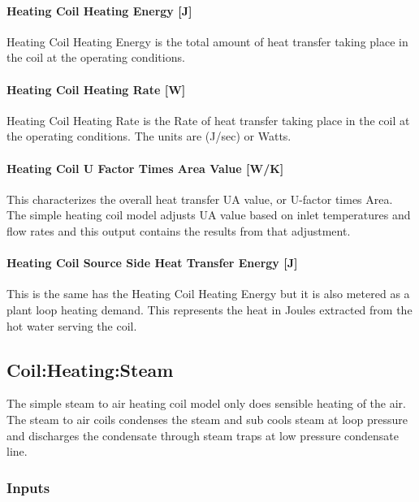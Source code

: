 \paragraph{Heating Coil Heating Energy {[}J{]}}\label{heating-coil-heating-energy-j}

Heating Coil Heating Energy is the total amount of heat transfer taking place in the coil at the operating conditions.

\paragraph{Heating Coil Heating Rate {[}W{]}}\label{heating-coil-heating-rate-w}

Heating Coil Heating Rate is the Rate of heat transfer taking place in the coil at the operating conditions. The units are (J/sec) or Watts.

\paragraph{Heating Coil U Factor Times Area Value {[}W/K{]}}\label{heating-coil-u-factor-times-area-value-wk}

This characterizes the overall heat transfer UA value, or U-factor times Area. The simple heating coil model adjusts UA value based on inlet temperatures and flow rates and this output contains the results from that adjustment.

\paragraph{Heating Coil Source Side Heat Transfer Energy {[}J{]}}\label{heating-coil-source-side-heat-transfer-energy-j}

This is the same has the Heating Coil Heating Energy but it is also metered as a plant loop heating demand. This represents the heat in Joules extracted from the hot water serving the coil.

\subsection{Coil:Heating:Steam}\label{coilheatingsteam}

The simple steam to air heating coil model only does sensible heating of the air. The steam to air coils condenses the steam and sub cools steam at loop pressure and discharges the condensate through steam traps at low pressure condensate line.

\subsubsection{Inputs}\label{inputs-2-019}

